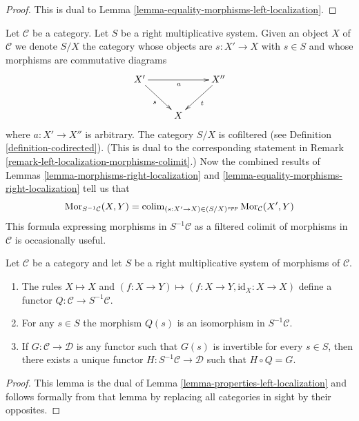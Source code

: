 \begin{proof}
This is dual to
Lemma \ref{lemma-equality-morphisms-left-localization}.
\end{proof}

\begin{remark}
\label{remark-right-localization-morphisms-colimit}
Let $\mathcal{C}$ be a category. Let $S$ be a right multiplicative system.
Given an object $X$ of $\mathcal{C}$ we denote $S/X$ the category whose
objects are $s : X' \to X$ with $s \in S$ and whose morphisms are
commutative diagrams
$$
\xymatrix{
X' \ar[rd]_s \ar[rr]_a & & X'' \ar[ld]^t \\
& X
}
$$
where $a : X' \to X''$ is arbitrary. The category
$S/X$ is cofiltered (see
Definition \ref{definition-codirected}).
(This is dual to the corresponding statement in
Remark \ref{remark-left-localization-morphisms-colimit}.)
Now the combined results of
Lemmas \ref{lemma-morphisms-right-localization} and
\ref{lemma-equality-morphisms-right-localization}
tell us that
\begin{equation}
\label{equation-right-localization-morphisms-colimit}
\mathop{\mathrm{Mor}}\nolimits_{S^{-1}\mathcal{C}}(X, Y) =
\mathop{\mathrm{colim}}\nolimits_{(s : X' \to X) \in (S/X)^{opp}} \mathop{\mathrm{Mor}}\nolimits_\mathcal{C}(X', Y)
\end{equation}
This formula expressing morphisms in $S^{-1}\mathcal{C}$ as a filtered
colimit of morphisms in $\mathcal{C}$ is occasionally useful.
\end{remark}

\begin{lemma}
\label{lemma-properties-right-localization}
Let $\mathcal{C}$ be a category and let $S$ be a right multiplicative
system of morphisms of $\mathcal{C}$.
\begin{enumerate}
\item The rules $X \mapsto X$ and
$(f : X \to Y) \mapsto (f : X \to Y, \text{id}_X : X \to X)$
define a functor $Q : \mathcal{C} \to S^{-1}\mathcal{C}$.
\item For any $s \in S$ the morphism $Q(s)$ is an isomorphism in
$S^{-1}\mathcal{C}$.
\item If $G : \mathcal{C} \to \mathcal{D}$ is any functor such that
$G(s)$ is invertible for every $s \in S$, then there exists a
unique functor $H : S^{-1}\mathcal{C} \to \mathcal{D}$
such that $H \circ Q = G$.
\end{enumerate}
\end{lemma}

\begin{proof}
This lemma is the dual of
Lemma \ref{lemma-properties-left-localization}
and follows formally from that lemma by replacing all
categories in sight by their opposites.
\end{proof}

